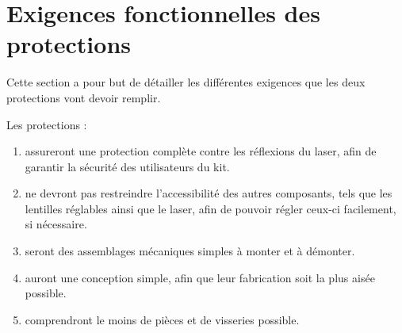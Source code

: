 \section{Exigences fonctionnelles des protections}
Cette section a pour but de détailler les différentes exigences que les deux protections vont devoir remplir.

Les protections :
\begin{enumerate}
    \item assureront une protection complète contre les réflexions du laser, afin de garantir la sécurité des utilisateurs du kit.
    \item ne devront pas restreindre l'accessibilité des autres composants, tels que les lentilles réglables ainsi que le laser, afin de pouvoir régler ceux-ci facilement, si nécessaire.
    \item seront des assemblages mécaniques simples à monter et à démonter.
    \item auront une conception simple, afin que leur fabrication soit la plus aisée possible.
    \item comprendront le moins de pièces et de visseries possible.
\end{enumerate}


